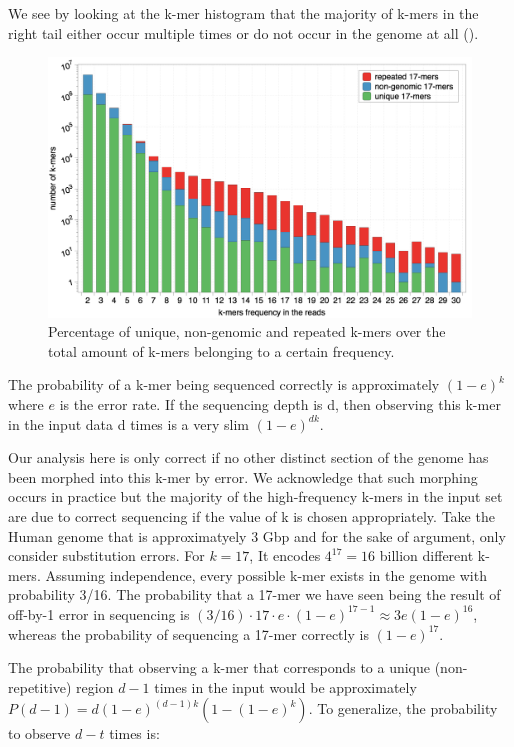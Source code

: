 \documentclass[11pt]{article}
\begin{document}
We see by looking at the k-mer histogram that the majority of k-mers in the right tail either occur multiple times or do not occur in the genome at all ().
\begin{figure}
    \centering
    \includegraphics[width=\textwidth]{image/histogram.png}
    \caption{Percentage of unique, non-genomic and repeated k-mers over the total amount of k-mers belonging to a certain frequency.}
    \label{fig:hist}
\end{figure}
The probability of a k-mer being sequenced correctly is approximately $(1-e)^k$ where $e$ is the error rate. If the sequencing depth is d, then observing this k-mer in the input data d times  is a very slim 
$(1-e)^{dk}$. 

Our analysis here is only correct if no other distinct section of the genome has been morphed into this k-mer by error. 
We acknowledge that such morphing occurs in practice but the majority of the high-frequency k-mers in the input set are due to correct sequencing if the value of k is chosen appropriately. Take the Human genome that is approximatyely $3$ Gbp and for the sake of argument, only consider substitution errors. For $k=17$, It encodes $4^{17}=16$ billion different k-mers. Assuming independence, every possible k-mer exists in the genome with probability 3/16. The probability that a 17-mer we have seen being the result of off-by-1 error in sequencing is $(3/16) \cdot 17 \cdot e \cdot (1-e)^{17-1} \approx 3 e (1-e)^{16}$, whereas the probability of sequencing a 17-mer correctly is $(1-e)^{17}$.

The probability that observing a k-mer that corresponds to a unique (non-repetitive) region $d-1$ times in the input would be approximately $P(d-1) = d (1-e)^{(d-1)k} (1-(1-e)^k)$. To generalize, the probability to observe $d-t$ times is:
\end{document}
